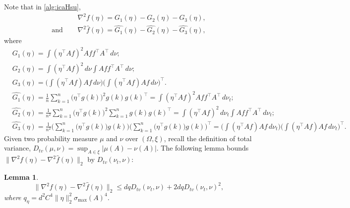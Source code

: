 \documentclass[english]{article} %
\newtheorem{lemma}{Lemma}[section]
\theoremstyle{definition}
\begin{document}
Note that in \cref{alg:icaHsu}, 
\begin{align*}
& \nabla^2 f(\eta) = G_1(\eta) - G_2(\eta) -G_3(\eta), \\
\text{and } \quad & \nabla^2 \widehat{f}(\eta) =\widehat{G_1}(\eta) - \widehat{G_2}(\eta) -\widehat{G_3}(\eta),
\end{align*}
where 
\begin{align*}
& G_1(\eta) = \int (\eta^{\top}Af)^2Aff^{\top}A^{\top}\,d\nu; \\
& G_2(\eta) = \int (\eta^{\top}Af)^2\,d\nu \int Aff^{\top}A^{\top} \,d\nu; \\
& G_3(\eta) = \Big(\int (\eta^{\top}Af)Af\,d\nu\Big)\Big(\int (\eta^{\top}Af)Af\,d\nu\Big)^{\top}. \\
&\widehat{ G_1}(\eta) = \frac1n\sum_{k=1}^{n} \big(\eta^{\top}g(k)\big)^2g(k)g(k)^{\top} = \int (\eta^{\top}Af)^2Aff^{\top}A^{\top}\,d\nu_t; \\
& \widehat{G_2}(\eta) = \frac{1}{n^2}\sum_{k=1}^{n} \big(\eta^{\top}g(k)\big)^2 \sum_{k=1}^{n}g(k)g(k)^{\top} = \int (\eta^{\top}Af)^2\,d\nu_t \int Aff^{\top}A^{\top} \,d\nu_t; \\
& \widehat{G_3}(\eta) = \frac{1}{n^2}\Big(\sum_{k=1}^{n} \big(\eta^{\top}g(k)\big)g(k)\Big) \Big(\sum_{k=1}^{n} \big(\eta^{\top}g(k)\big)g(k)\Big)^{\top} = \Big(\int (\eta^{\top}Af)Af\,d\nu_t\Big)\Big(\int (\eta^{\top}Af)Af\,d\nu_t\Big)^{\top}.
\end{align*}
Given two probability measure $\mu$ and $\nu$ over $(\Omega , \xi)$, recall the definition of total variance, $D_{tv}(\mu, \nu) = \sup_{A\in\xi} |\mu(A) - \nu(A)|$. 
The following lemma bounds $\|\nabla^2 f(\eta) - \nabla^2 \widehat{f}(\eta) \|_2$ by $D_{tv}(\nu_t , \nu)$:
\begin{lemma}
\label{lem:nablavariation}
\[
\|\nabla^2 f(\eta) - \nabla^2 \widehat{f}(\eta)  \|_2 \le d q D_{tv}(\nu_t , \nu) + 2dq D_{tv}(\nu_t , \nu)^2,
\]
where $q_{\eta} = d^2C^4\|\eta\|_2^2\sigma_{\max}(A)^4$.
\end{lemma}
\end{document}
